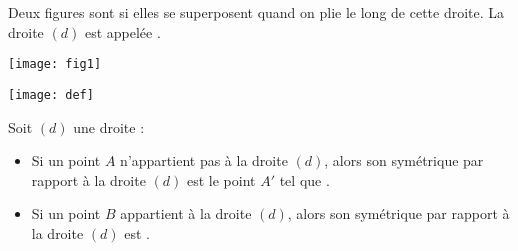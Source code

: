 \begin{mydef}
	Deux figures sont  si elles se superposent quand on plie le long de cette droite. 
	La droite $(d)$ est appelée .

\end{mydef}




\begin{myex}
	\begin{center}
		\texttt{[image: fig1]}
	\end{center}	
\end{myex}

\begin{multicols}{2}
	
	\begin{center}
		\texttt{[image: def]}
	\end{center}
	
	\begin{myprops}
		Soit $(d)$ une droite :
		\begin{itemize}
			\item Si un point $A$ n'appartient pas à la droite $(d)$, alors son symétrique par rapport à la droite $(d)$ est le point $A'$ tel que .
			\item Si un point $B$ appartient à la droite $(d)$, alors son symétrique par rapport à la droite $(d)$ est .
		\end{itemize}
	\end{myprops}
	
	
\end{multicols}
